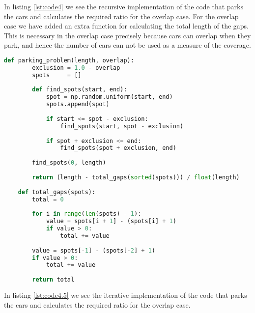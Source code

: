 In listing \ref{lst:code4} we see the recursive implementation of the code 
that parks the cars and calculates the required ratio for the overlap case. 
For the overlap case we have added an extra function for calculating the total  
length of the gaps. This is necessary in the overlap case precisely because 
cars can overlap when they park, and hence the number of cars can not be used 
as a measure of the coverage. \bigskip

\begin{lstlisting}[language=python,caption=Parking Problem - Recursive - overlap case,label=lst:code4]
	def parking_problem(length, overlap):
		exclusion = 1.0 - overlap
		spots     = []
		
		def find_spots(start, end):
			spot = np.random.uniform(start, end)
			spots.append(spot)
			
			if start <= spot - exclusion:
				find_spots(start, spot - exclusion)
			
			if spot + exclusion <= end:
				find_spots(spot + exclusion, end)
		
		find_spots(0, length)
		
		return (length - total_gaps(sorted(spots))) / float(length)
	
	def total_gaps(spots):
		total = 0
		
		for i in range(len(spots) - 1):
			value = spots[i + 1] - (spots[i] + 1)
			if value > 0:
				total += value 
		
		value = spots[-1] - (spots[-2] + 1)
		if value > 0:
			total += value 
		
		return total

\end{lstlisting}  \bigskip

In listing \ref{lst:code4.5} we see the iterative implementation of the code 
that parks the cars and calculates the required ratio for the overlap case. \bigskip

